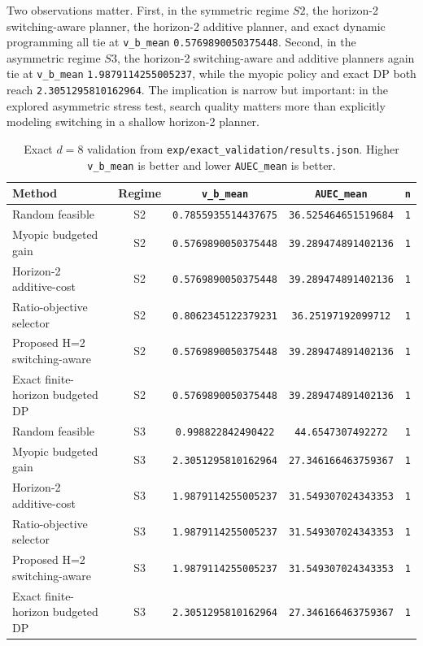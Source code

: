 \documentclass[10pt]{article}
\begin{document}
Two observations matter. First, in the symmetric regime $S2$, the horizon-2 switching-aware planner, the horizon-2 additive planner, and exact dynamic programming all tie at \texttt{v\_b\_mean} \texttt{0.5769890050375448}. Second, in the asymmetric regime $S3$, the horizon-2 switching-aware and additive planners again tie at \texttt{v\_b\_mean} \texttt{1.9879114255005237}, while the myopic policy and exact DP both reach \texttt{2.3051295810162964}. The implication is narrow but important: in the explored asymmetric stress test, search quality matters more than explicitly modeling switching in a shallow horizon-2 planner.

\begin{table}[t]
\caption{Exact $d{=}8$ validation from \texttt{exp/exact\_validation/results.json}. Higher \texttt{v\_b\_mean} is better and lower \texttt{AUEC\_mean} is better.}
\label{tab:exact}
\centering
\scriptsize
\begin{tabular}{lcccc}
\toprule
Method & Regime & \texttt{v\_b\_mean} & \texttt{AUEC\_mean} & \texttt{n} \\
\midrule
Random feasible & S2 & \texttt{0.7855935514437675} & \texttt{36.525464651519684} & \texttt{1} \\
Myopic budgeted gain & S2 & \texttt{0.5769890050375448} & \texttt{39.289474891402136} & \texttt{1} \\
Horizon-2 additive-cost & S2 & \texttt{0.5769890050375448} & \texttt{39.289474891402136} & \texttt{1} \\
Ratio-objective selector & S2 & \texttt{0.8062345122379231} & \texttt{36.25197192099712} & \texttt{1} \\
Proposed H=2 switching-aware & S2 & \texttt{0.5769890050375448} & \texttt{39.289474891402136} & \texttt{1} \\
Exact finite-horizon budgeted DP & S2 & \texttt{0.5769890050375448} & \texttt{39.289474891402136} & \texttt{1} \\
\midrule
Random feasible & S3 & \texttt{0.998822842490422} & \texttt{44.6547307492272} & \texttt{1} \\
Myopic budgeted gain & S3 & \texttt{2.3051295810162964} & \texttt{27.346166463759367} & \texttt{1} \\
Horizon-2 additive-cost & S3 & \texttt{1.9879114255005237} & \texttt{31.549307024343353} & \texttt{1} \\
Ratio-objective selector & S3 & \texttt{1.9879114255005237} & \texttt{31.549307024343353} & \texttt{1} \\
Proposed H=2 switching-aware & S3 & \texttt{1.9879114255005237} & \texttt{31.549307024343353} & \texttt{1} \\
Exact finite-horizon budgeted DP & S3 & \texttt{2.3051295810162964} & \texttt{27.346166463759367} & \texttt{1} \\
\bottomrule
\end{tabular}
\end{table}
\end{document}
